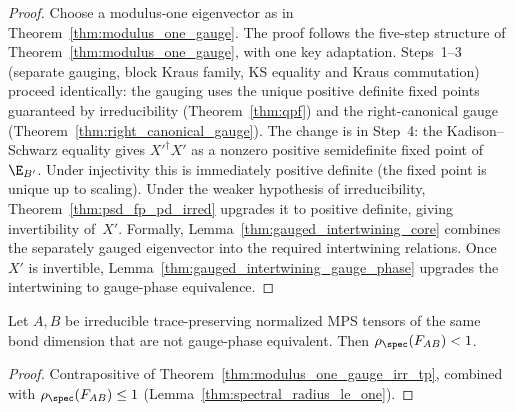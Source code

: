 \begin{proof}
    \leanok
    Choose a modulus-one eigenvector as in
    Theorem~\ref{thm:modulus_one_gauge}.
    The proof follows the five-step structure of
    Theorem~\ref{thm:modulus_one_gauge}, with one key adaptation.
    Steps~1--3 (separate gauging, block Kraus family, KS equality and
    Kraus commutation) proceed identically: the gauging uses the
    unique positive definite fixed points guaranteed by irreducibility
    (Theorem~\ref{thm:qpf}) and the right-canonical gauge
    (Theorem~\ref{thm:right_canonical_gauge}).
    The change is in Step~4: the Kadison--Schwarz equality gives
    $X'^\dagger X'$ as a nonzero positive semidefinite fixed point of
    $\E_{B'}$.
    Under injectivity this is immediately positive definite (the fixed
    point is unique up to scaling).
    Under the weaker hypothesis of irreducibility,
    Theorem~\ref{thm:psd_fp_pd_irred} upgrades it to positive
    definite, giving invertibility of~$X'$.
    Formally, Lemma~\ref{thm:gauged_intertwining_core} combines the
    separately gauged eigenvector into the required intertwining
    relations.
    Once $X'$ is invertible, Lemma~\ref{thm:gauged_intertwining_gauge_phase}
    upgrades the intertwining to gauge-phase equivalence.
\end{proof}

\begin{theorem}%
    \label{thm:transfer_operator_gap_irr_tp}
    \leanok
    Let $A, B$ be irreducible trace-preserving normalized MPS tensors
    of the same bond dimension that are not gauge-phase equivalent.
    Then $\rho_{\spec}(F_{AB}) < 1$.
\end{theorem}

\begin{proof}\leanok{}
    Contrapositive of
    Theorem~\ref{thm:modulus_one_gauge_irr_tp}, combined with
    $\rho_{\spec}(F_{AB}) \le 1$
    (Lemma~\ref{thm:spectral_radius_le_one}).
\end{proof}

